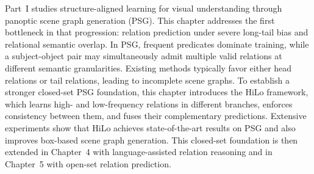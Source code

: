 Part~I studies structure-aligned learning for visual understanding through panoptic scene graph generation (PSG).
This chapter addresses the first bottleneck in that progression: relation prediction under severe long-tail bias and relational semantic overlap.
In PSG, frequent predicates dominate training, while a subject-object pair may simultaneously admit multiple valid relations at different semantic granularities.
Existing methods typically favor either head relations or tail relations, leading to incomplete scene graphs.
To establish a stronger closed-set PSG foundation, this chapter introduces the HiLo framework, which learns high- and low-frequency relations in different branches, enforces consistency between them, and fuses their complementary predictions.
Extensive experiments show that HiLo achieves state-of-the-art results on PSG and also improves box-based scene graph generation.
This closed-set foundation is then extended in Chapter~4 with language-assisted relation reasoning and in Chapter~5 with open-set relation prediction.
